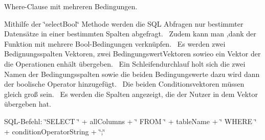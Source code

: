 Where-\/\+Clause mit mehreren Bedingungen. 

Mithilfe der \char`\"{}select\+Bool\char`\"{} Methode werden die S\+QL Abfragen nur bestimmter Datensätze in einer bestimmten Spalten abgefragt.~\newline
 Zudem kann man ,dank der Funktion mit mehrere Bool-\/\+Bedingungen verknüpfen.~\newline
 Es werden zwei Bedignungsspalten Vektoren, zwei Bedingungswert\+Vektoren sowieo ein Vektor der die Operationen enhält übergeben.~\newline
 Ein Schleifendurchlauf holt sich die zwei Namen der Bedingungsspalten sowie die beiden Bedingungswerte dazu wird dann der boolische Operator hinzugefügt.~\newline
 Die beiden Conditionsvektoren müssen gleich groß sein.~\newline
 Es werden die Spalten angezeigt, die der Nutzer in dem Vektor übergeben hat.~\newline


S\+Q\+L-\/\+Befehl\+: \char`\"{}\+S\+E\+L\+E\+C\+T \char`\"{} + all\+Columns + \char`\"{} F\+R\+O\+M \char`\"{} + table\+Name + \char`\"{} W\+H\+E\+R\+E \char`\"{} + condition\+Operator\+String + \char`\"{};\char`\"{}


